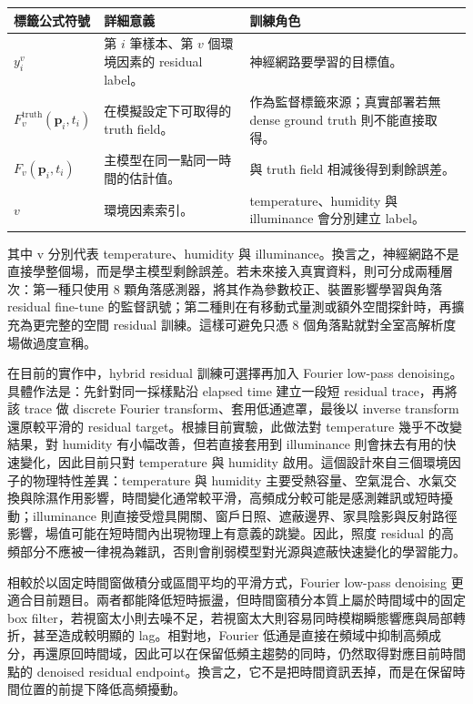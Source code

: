 \documentclass[12pt,a4paper]{article}
\begin{document}
\begin{table}[htbp]
\centering
\footnotesize
\renewcommand{\arraystretch}{1.25}
\begin{tabular}{|>{\raggedright\arraybackslash}p{}|>{\raggedright\arraybackslash}p{}|>{\raggedright\arraybackslash}p{}|}
\hline
\textbf{標籤公式符號} & \textbf{詳細意義} & \textbf{訓練角色} \\
\hline
$y_i^v$ & 第 $i$ 筆樣本、第 $v$ 個環境因素的 residual label。 & 神經網路要學習的目標值。 \\
\hline
$F_v^{\text{truth}}(\mathbf{p}_i,t_i)$ & 在模擬設定下可取得的 truth field。 & 作為監督標籤來源；真實部署若無 dense ground truth 則不能直接取得。 \\
\hline
$F_v(\mathbf{p}_i,t_i)$ & 主模型在同一點同一時間的估計值。 & 與 truth field 相減後得到剩餘誤差。 \\
\hline
$v$ & 環境因素索引。 & temperature、humidity 與 illuminance 會分別建立 label。 \\
\hline
\end{tabular}
\end{table}

其中 v 分別代表 temperature、humidity 與 illuminance。換言之，神經網路不是直接學整個場，而是學主模型剩餘誤差。若未來接入真實資料，則可分成兩種層次：第一種只使用 8 顆角落感測器，將其作為參數校正、裝置影響學習與角落 residual fine-tune 的監督訊號；第二種則在有移動式量測或額外空間探針時，再擴充為更完整的空間 residual 訓練。這樣可避免只憑 8 個角落點就對全室高解析度場做過度宣稱。


在目前的實作中，hybrid residual 訓練可選擇再加入 Fourier low-pass denoising。具體作法是：先針對同一採樣點沿 elapsed time 建立一段短 residual trace，再將該 trace 做 discrete Fourier transform、套用低通遮罩，最後以 inverse transform 還原較平滑的 residual target。根據目前實驗，此做法對 temperature 幾乎不改變結果，對 humidity 有小幅改善，但若直接套用到 illuminance 則會抹去有用的快速變化，因此目前只對 temperature 與 humidity 啟用。這個設計來自三個環境因子的物理特性差異：temperature 與 humidity 主要受熱容量、空氣混合、水氣交換與除濕作用影響，時間變化通常較平滑，高頻成分較可能是感測雜訊或短時擾動；illuminance 則直接受燈具開關、窗戶日照、遮蔽邊界、家具陰影與反射路徑影響，場值可能在短時間內出現物理上有意義的跳變。因此，照度 residual 的高頻部分不應被一律視為雜訊，否則會削弱模型對光源與遮蔽快速變化的學習能力。


相較於以固定時間窗做積分或區間平均的平滑方式，Fourier low-pass denoising 更適合目前題目。兩者都能降低短時振盪，但時間窗積分本質上屬於時間域中的固定 box filter，若視窗太小則去噪不足，若視窗太大則容易同時模糊瞬態響應與局部轉折，甚至造成較明顯的 lag。相對地，Fourier 低通是直接在頻域中抑制高頻成分，再還原回時間域，因此可以在保留低頻主趨勢的同時，仍然取得對應目前時間點的 denoised residual endpoint。換言之，它不是把時間資訊丟掉，而是在保留時間位置的前提下降低高頻擾動。
\end{document}
